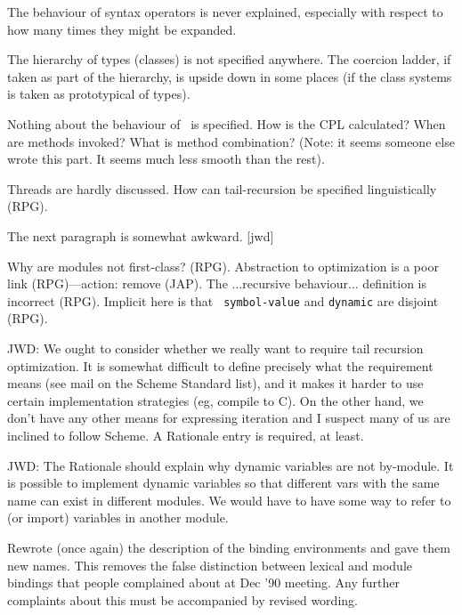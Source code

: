 \begin{introduction}
\label{sec:intro}
\begin{optPrivate}
    The behaviour of syntax operators is never explained, especially with
    respect to how many times they might be expanded.

    The hierarchy of types (classes) is not specified anywhere.  The coercion
    ladder, if taken as part of the hierarchy, is upside down in some places (if
    the class systems is taken as prototypical of types).

    Nothing about the behaviour of \telos\ is specified.  How is the CPL
    calculated?  When are methods invoked?  What is method combination?  (Note:
    it seems someone else wrote this part.  It seems much less smooth than the
    rest).

    Threads are hardly discussed.  How can tail-recursion be specified
    linguistically (RPG).

    The next paragraph is somewhat awkward.  [jwd]

    Why are modules not first-class? (RPG).  Abstraction to optimization is a
    poor link (RPG)---action: remove (JAP).  The ...recursive
    behaviour... definition is incorrect (RPG).  Implicit here is that {\tt
        symbol-value} and {\tt dynamic} are disjoint (RPG).

    JWD: We ought to consider whether we really want to require tail recursion
    optimization.  It is somewhat difficult to define precisely what the
    requirement means (see mail on the Scheme Standard list), and it makes it
    harder to use certain implementation strategies (eg, compile to C).  On the
    other hand, we don't have any other means for expressing iteration and I
    suspect many of us are inclined to follow Scheme.  A Rationale entry is
    required, at least.

    JWD: The Rationale should explain why dynamic variables are not by-module.
    It is possible to implement dynamic variables so that different vars with
    the same name can exist in different modules.  We would have to have some
    way to refer to (or import) variables in another module.

    Rewrote (once again) the description of the binding environments and gave
    them new names.  This removes the false distinction between lexical and
    module bindings that people complained about at Dec '90 meeting.  Any
    further complaints about this must be accompanied by revised wording.
\end{optPrivate}


\end{introduction}
